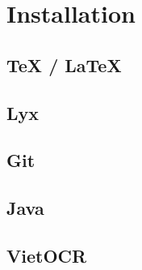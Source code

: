 
\section{Installation}

\subsection{\protect\TeX{} / \protect\LaTeX}

\subsection{Lyx}

\subsection{Git}

\subsection{Java}

\subsection{VietOCR}
